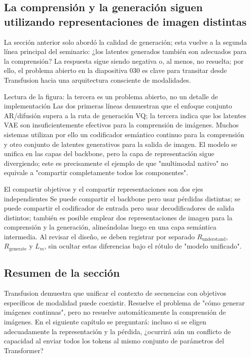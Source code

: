\subsection{La comprensión y la generación siguen utilizando representaciones de imagen distintas}

La sección anterior solo abordó la calidad de generación; esta vuelve a la segunda línea principal del seminario: ¿los latentes generados también son adecuados para la comprensión? La respuesta sigue siendo negativa o, al menos, no resuelta; por ello, el problema abierto en la diapositiva 030 es clave para transitar desde Transfusion hacia una arquitectura consciente de modalidades.


\begin{knowledgebox}{Lectura de la figura: la tercera es un problema abierto, no un detalle de implementación}
Las dos primeras líneas demuestran que el enfoque conjunto AR/difusión supera a la ruta de generación VQ; la tercera indica que los latentes VAE son insuficientemente efectivos para la comprensión de imágenes. Muchos sistemas utilizan por ello un codificador semántico continuo para la comprensión y otro conjunto de latentes generativos para la salida de imagen. El modelo se unifica en las capas del backbone, pero la capa de representación sigue divergiendo; este es precisamente el ejemplo de que "multimodal nativo" no equivale a "compartir completamente todos los componentes".
\end{knowledgebox}

\begin{importantbox}{El compartir objetivos y el compartir representaciones son dos ejes independientes}
Se puede compartir el backbone pero usar pérdidas distintas; se puede compartir el codificador de entrada pero usar decodificadores de salida distintos; también es posible emplear dos representaciones de imagen para la comprensión y la generación, alineándolas luego en una capa semántica intermedia. Al revisar el diseño, se deben registrar por separado $R_{\text{understand}}$, $R_{\text{generate}}$ y $L_m$, sin ocultar estas diferencias bajo el rótulo de "modelo unificado".
\end{importantbox}

\subsection{Resumen de la sección}

Transfusion demuestra que unificar el contexto de secuencias con objetivos específicos de modalidad puede coexistir. Resuelve el problema de "cómo generar imágenes continuas", pero no resuelve automáticamente la comprensión de imágenes. En el siguiente capítulo se preguntará: incluso si se eligen adecuadamente la representación y la pérdida, ¿ocurrirá aún un conflicto de capacidad al enviar todos los tokens al mismo conjunto de parámetros del Transformer?


